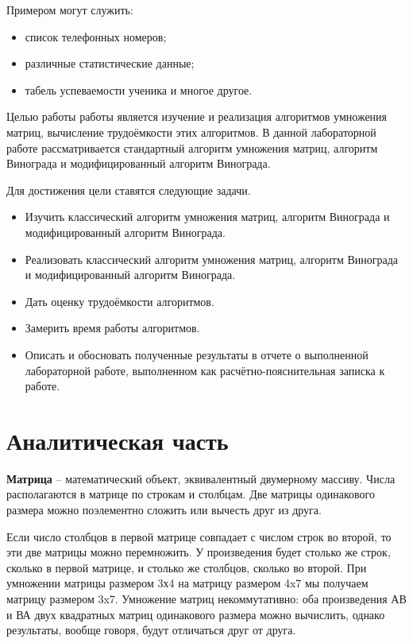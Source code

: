 \documentclass[12pt]{report}
\begin{document}
Примером могут служить:

\begin{itemize}
	\item список телефонных номеров;
	\item различные статистические данные;
	\item табель успеваемости ученика и многое другое.
\end{itemize}

Целью работы работы является изучение и реализация алгоритмов умножения матриц, вычисление трудоёмкости этих алгоритмов. В данной лабораторной работе рассматривается стандартный алгоритм умножения матриц, алгоритм Винограда и модифицированный алгоритм Винограда.
\newline

Для достижения цели ставятся следующие задачи.
\begin{itemize}
	\item Изучить классический алгоритм умножения матриц, алгоритм Винограда и модифицированный алгоритм Винограда.
	\item Реализовать классический алгоритм умножения матриц, алгоритм Винограда и модифицированный алгоритм Винограда.
	\item Дать оценку трудоёмкости алгоритмов.
	\item Замерить время работы алгоритмов.
	\item Описать и обосновать полученные результаты в отчете о выполненной лабораторной
	работе, выполненном как расчётно-пояснительная записка к работе. 
\end{itemize}

\chapter{Аналитическая часть}

\textbf{Матрица} – математический объект, эквивалентный двумерному массиву. Числа располагаются в матрице по строкам и столбцам. Две матрицы одинакового размера можно поэлементно сложить или вычесть друг из друга.
\newline

Если число столбцов в первой матрице совпадает с числом строк во второй, то эти две матрицы можно перемножить. У произведения будет столько же строк, сколько в первой матрице, и столько же столбцов, сколько во второй. При умножении матрицы размером 3х4 на матрицу размером 4x7 мы получаем матрицу размером 3x7. Умножение матриц некоммутативно: оба произведения АВ и ВА двух квадратных матриц одинакового размера можно вычислить, однако результаты, вообще говоря, будут отличаться друг от друга.
\end{document}
